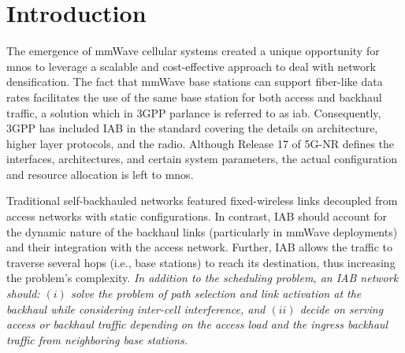 

\newcommand{\sref}[1]{Section~\ref{#1}}
\newcommand{\tref}[1]{Table~\ref{#1}}

\newcommand{\ceil}[1]{\lceil{#1}\rceil}




\section{Introduction}
\label{s:introduction}

The emergence of mmWave cellular systems created a unique opportunity for \glspl{mno} to leverage a scalable and cost-effective approach to deal with network densification. The fact that mmWave base stations can support fiber-like data rates facilitates the use of the same base station for both access and backhaul traffic, a solution which in 3GPP parlance is referred to as \gls{iab}. Consequently, 3GPP has included IAB in the standard \cite{3gpp.38.300, 3gpp_38_174} covering the details on architecture, higher layer protocols, and the radio. Although Release 17 of 5G-NR defines the interfaces, architectures, and certain system parameters, the actual configuration and resource allocation is left to \glspl{mno}.

Traditional self-backhauled networks featured fixed-wireless links decoupled from access networks with static configurations. In contrast, IAB should account for the dynamic nature of the backhaul links (particularly in mmWave deployments) and their integration with the access network. Further, IAB allows the traffic to traverse several hops (i.e., base stations) to reach its destination, thus increasing the problem's complexity. \textit{In addition to the scheduling problem, an IAB network should: $(i)$ solve the problem of path selection and link activation at the backhaul while considering inter-cell interference, and $(ii)$ decide on serving access or backhaul traffic depending on the access load and the ingress backhaul traffic from neighboring base stations.}

